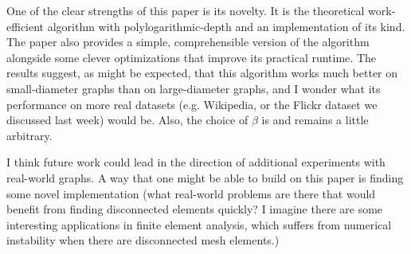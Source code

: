 One of the clear strengths of this paper is its novelty. It is the theoretical work-efficient algorithm with polylogarithmic-depth and an implementation of its kind. The paper also provides a simple, comprehensible version of the algorithm alongside some clever optimizations that improve its practical runtime. The results suggest, as might be expected, that this algorithm works much better on small-diameter graphs than on large-diameter graphs, and I wonder what its performance on more real datasets (e.g. Wikipedia, or the Flickr dataset we discussed last week) would be. Also, the choice of $\beta$ is and remains a little arbitrary.

I think future work could lead in the direction of additional experiments with real-world graphs. A way that one might be able to build on this paper is finding some novel implementation (what real-world problems are there that would benefit from finding disconnected elements quickly? I imagine there are some interesting applications in finite element analysis, which suffers from numerical instability when there are disconnected mesh elements.)